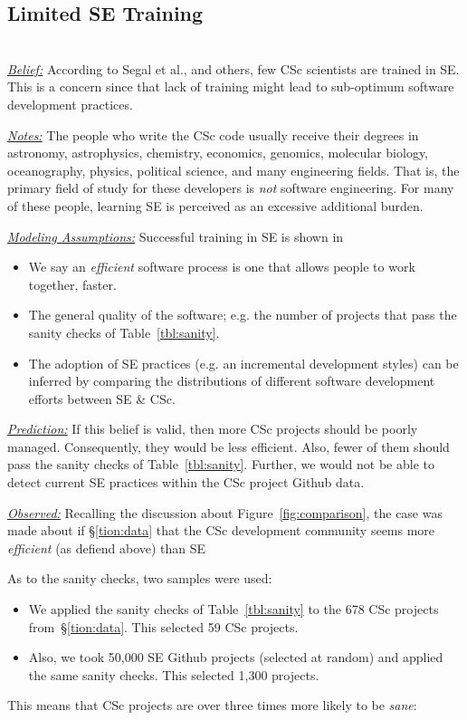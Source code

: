 \documentclass[conference,10pt]{IEEEtran}
\newcommand{\bi}{\begin{itemize}}
\newcommand{\ei}{\end{itemize}}
\begin{document}
\subsection{Limited SE Training} ~\\
\noindent \textit{\underline{Belief:}} According to Segal et al.,
and others\cite{segal07_enduser, basili08_hpc, carver13_perception, easterbrook_cs, sanders08_risk}, few CSc scientists are trained in SE.
This is a concern since that lack of training might lead to sub-optimum software
development practices.

\noindent \textit{\underline{Notes:}} 
The people who write the CSc code usually
receive their degrees in
astronomy, astrophysics, chemistry, economics, genomics, molecular biology, oceanography, physics, political science, and many engineering fields.
That is, the primary field of study for these developers is {\em not}
software engineering. For many of these people,
learning SE is perceived as an excessive additional burden\cite{boyle09_lessons}. 

\noindent \textit{\underline{Modeling Assumptions:}} 
Successful training in SE is shown in
\bi
\item We say an {\em efficient} software process is one that allows  people to work together, faster. 
\item The general quality of the software; e.g. the number of projects that pass the sanity checks of Table~\ref{tbl:sanity}.
\item The adoption of SE practices (e.g. an incremental development styles) can be inferred by comparing the distributions of different software development efforts between SE \& CSc.
\ei

\noindent \textit{\underline{Prediction:}} If this belief is valid, then more CSc
projects should be poorly managed. Consequently, they would be less efficient. Also, fewer of them should
pass the sanity checks of Table~\ref{tbl:sanity}.
Further, we would not be able to detect current SE  practices within the CSc project Github data.

\noindent \textit{\underline{Observed:}}
Recalling  the discussion about 
Figure~\ref{fig:comparison},
the case was made about if \S\ref{tion:data} that the CSc development community
seems more {\em efficient} (as defiend above) than SE 

As to the sanity checks, 
two samples were used:
\bi
\item
We applied the sanity checks
of Table~\ref{tbl:sanity} to the 678 CSc projects from~\S\ref{tion:data}. This selected 59 CSc projects.
\item
Also, we took 50,000 SE Github projects (selected at random) and applied
the same sanity checks. This selected 1,300 projects.
\ei
This means that CSc projects are over three times more likely to be {\em sane}: 
\end{document}
